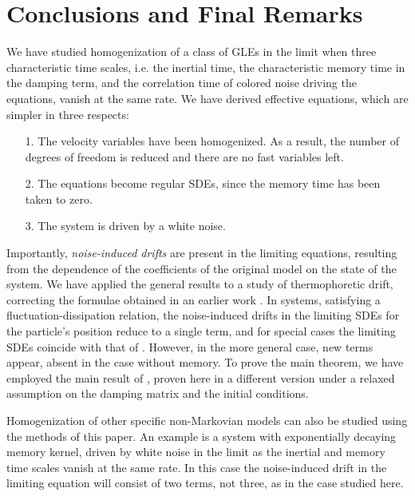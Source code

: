 

\section{Conclusions and Final Remarks} \label{conc}
We have studied homogenization of a  class of GLEs in the limit when three characteristic time scales, i.e. the inertial time, the characteristic memory time in the damping term, and the correlation time of colored noise driving the equations, vanish at the same rate.  We have derived effective equations, which are simpler in three respects:  
\begin{itemize}
\item[1.]  The velocity variables have been homogenized.  As a result, the number of degrees of freedom is reduced and there are no fast variables left.
\item[2.]  The equations become regular SDEs, since the memory time has been taken to zero.  
\item[3.]  The system is driven by a white noise. 
\end{itemize}

Importantly, {\it noise-induced drifts} are present in the limiting equations, resulting from the dependence of the coefficients of the original model on the state of the system.  We have applied the general results to a study of thermophoretic drift, correcting the formulae obtained in an earlier work \cite{Hottovy2012a}.  In systems, satisfying a fluctuation-dissipation relation, the noise-induced drifts in the limiting SDEs for the particle's position reduce to a single term, and for special cases the limiting SDEs coincide with that of \cite{hottovy2015smoluchowski}. However, in the more general case, new terms appear, absent in the case without memory.  To prove the main theorem, we have employed  the main result of \cite{hottovy2015smoluchowski}, proven here in a different version under a relaxed assumption on the damping matrix and the initial conditions.

Homogenization of other specific non-Markovian models can also be studied using the methods of this paper.  An example is a system with exponentially decaying memory kernel, driven by white noise in the limit as the inertial and memory time scales vanish at the same rate.  In this case the noise-induced drift in the limiting equation will consist of two terms, not three, as in the case studied here.

